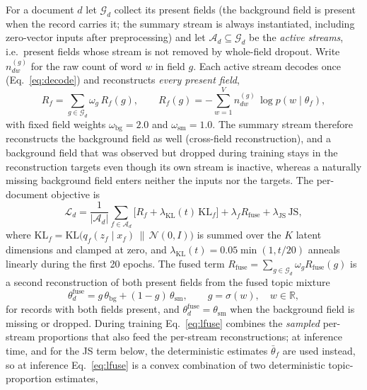 \documentclass[11pt]{article}
\begin{document}
For a document $d$ let $\mathcal{G}_d$ collect its present fields (the background field is present
when the record carries it; the summary stream is always instantiated, including zero-vector
inputs after preprocessing) and let
$\mathcal{A}_d\subseteq\mathcal{G}_d$ be the \emph{active streams}, i.e.\ present fields whose
stream is not removed by whole-field dropout. Write $n^{(g)}_{dw}$ for the raw count of word $w$
in field $g$. Each active stream decodes once (Eq.~\eqref{eq:decode}) and reconstructs
\emph{every present field},
\begin{equation}
R_f=\sum_{g\in\mathcal{G}_d}\omega_g\,R_f(g),\qquad
R_f(g)=-\sum_{w=1}^{V} n^{(g)}_{dw}\,\log p\!\left(w\mid\theta_f\right),
\label{eq:recon}
\end{equation}
with fixed field weights $\omega_{\mathrm{bg}}=2.0$ and $\omega_{\mathrm{sm}}=1.0$. The summary
stream therefore reconstructs the background field as well (cross-field reconstruction), and a
background field that was observed but dropped during training stays in the reconstruction
targets even though its own stream is inactive, whereas a naturally missing background field
enters neither the inputs nor the targets. The per-document objective is
\begin{equation}
\mathcal{L}_d=\frac{1}{|\mathcal{A}_d|}\sum_{f\in\mathcal{A}_d}
\Big[R_f+\lambda_{\mathrm{KL}}(t)\,\mathrm{KL}_f\Big]
+\lambda_f R_{\mathrm{fuse}}+\lambda_{\mathrm{JS}}\,\mathrm{JS},
\label{eq:total}
\end{equation}
where $\mathrm{KL}_f=\mathrm{KL}\big(q_f(z_f\mid x_f)\,\|\,\mathcal N(0,I)\big)$ is summed over
the $K$ latent dimensions and clamped at zero, and $\lambda_{\mathrm{KL}}(t)=0.05\min(1,t/20)$
anneals linearly during the first 20 epochs. The fused term
$R_{\mathrm{fuse}}=\sum_{g\in\mathcal{G}_d}\omega_g R_{\mathrm{fuse}}(g)$ is a second
reconstruction of both present fields from the fused topic mixture
\begin{equation}
\theta_d^{\mathrm{fuse}}=g\,\theta_{\mathrm{bg}}+(1-g)\,\theta_{\mathrm{sm}},
\qquad g=\sigma(w),\quad w\in\mathbb{R},
\label{eq:lfuse}
\end{equation}
for records with both fields present, and
$\theta_d^{\mathrm{fuse}}=\theta_{\mathrm{sm}}$ when the background field is missing or
dropped. During training Eq.~\eqref{eq:lfuse} combines the \emph{sampled} per-stream
proportions that also feed the per-stream reconstructions; at inference time, and for the JS
term below, the deterministic estimates $\bar\theta_f$ are used instead, so at inference
Eq.~\eqref{eq:lfuse} is a convex combination of two deterministic topic-proportion estimates,
\end{document}
